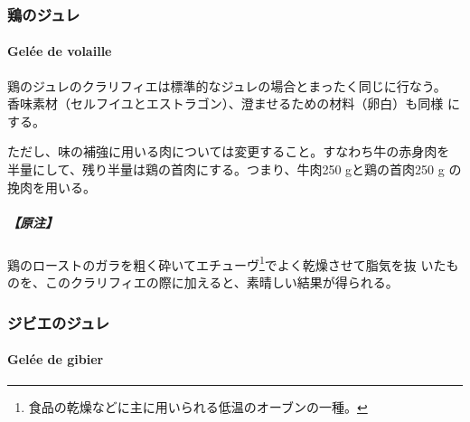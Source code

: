 \begin{recette}
\maeaki

\hypertarget{ux9d8fux306eux30b8ux30e5ux30ec}{%
\subsubsection{鶏のジュレ}\label{ux9d8fux306eux30b8ux30e5ux30ec}}

\hypertarget{gelees-de-volaille}{%
\paragraph{Gelée de volaille}\label{gelees-de-volaille}}


鶏のジュレのクラリフィエは標準的なジュレの場合とまったく同じに行なう。
香味素材（セルフイユとエストラゴン）、澄ませるための材料（卵白）も同様
にする。

ただし、味の補強に用いる肉については変更すること。すなわち牛の赤身肉を
半量にして、残り半量は鶏の首肉にする。つまり、牛肉250 gと鶏の首肉250 g
の挽肉を用いる。

\hypertarget{ux539fux6ce8-1}{%
\subparagraph{【原注】}\label{ux539fux6ce8-1}}

鶏のローストのガラを粗く砕いてエチューヴ\footnote{食品の乾燥などに主に用いられる低温のオーブンの一種。}でよく乾燥させて脂気を抜
いたものを、このクラリフィエの際に加えると、素晴しい結果が得られる。

\maeaki

\hypertarget{ux30b8ux30d3ux30a8ux306eux30b8ux30e5ux30ec}{%
\subsubsection{ジビエのジュレ}\label{ux30b8ux30d3ux30a8ux306eux30b8ux30e5ux30ec}}

\hypertarget{gelee-de-gibier}{%
\paragraph{Gelée de gibier}\label{gelee-de-gibier}}



\end{recette}
